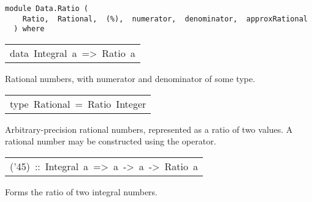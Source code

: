 \label{module:Data.Ratio}
\haddockbeginheader
{\haddockverb\begin{verbatim}
module Data.Ratio (
    Ratio,  Rational,  (%),  numerator,  denominator,  approxRational
  ) where\end{verbatim}}
\haddockendheader

\begin{haddockdesc}
\item[\begin{tabular}{@{}l}
data\ Integral\ a\ =>\ Ratio\ a
\end{tabular}]\haddockbegindoc
Rational numbers, with numerator and denominator of some  type.
\par

\end{haddockdesc}
\begin{haddockdesc}
\item[\begin{tabular}{@{}l}
instance\ Integral\ a\ =>\ Enum\ (Ratio\ a)\\instance\ Integral\ a\ =>\ Eq\ (Ratio\ a)\\instance\ Integral\ a\ =>\ Fractional\ (Ratio\ a)\\instance\ Integral\ a\ =>\ Num\ (Ratio\ a)\\instance\ Integral\ a\ =>\ Ord\ (Ratio\ a)\\instance\ (Integral\ a,\ Read\ a)\ =>\ Read\ (Ratio\ a)\\instance\ Integral\ a\ =>\ Real\ (Ratio\ a)\\instance\ Integral\ a\ =>\ RealFrac\ (Ratio\ a)\\instance\ Integral\ a\ =>\ Show\ (Ratio\ a)
\end{tabular}]
\end{haddockdesc}
\begin{haddockdesc}
\item[\begin{tabular}{@{}l}
type\ Rational\ =\ Ratio\ Integer
\end{tabular}]\haddockbegindoc
Arbitrary-precision rational numbers, represented as a ratio of
 two  values.  A rational number may be constructed using
 the  operator.
\par

\end{haddockdesc}
\begin{haddockdesc}
\item[\begin{tabular}{@{}l}
({\char '45})\ ::\ Integral\ a\ =>\ a\ ->\ a\ ->\ Ratio\ a
\end{tabular}]\haddockbegindoc
Forms the ratio of two integral numbers.
\par

\end{haddockdesc}
